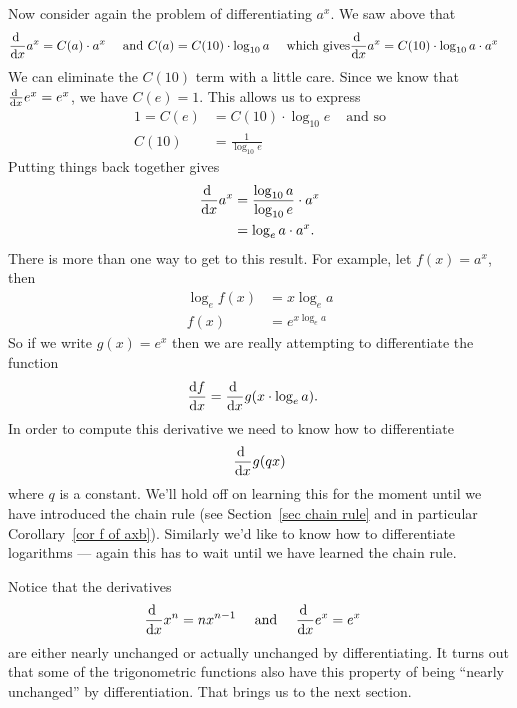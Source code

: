 Now consider again the problem of differentiating $a^x$. We saw above that
\begin{align*}
  \diff{}{x} a^x &= C(a) \cdot a^x & \text{ and }
  C(a) &= C(10) \cdot \log_{10} a & \text{ which gives}
  \diff{}{x} a^x &= C(10)\cdot \log_{10} a \cdot a^x
\end{align*}
We can eliminate the $C(10)$ term with a little care. Since we know that $\diff{}{x} e^x
= e^x$, we have $C(e)=1$. This allows us to express
\begin{align*}
  1 = C(e) &= C(10) \cdot \log_{10} e & \text{ and so} \\
  C(10) &= \frac{1}{\log_{10} e}
\end{align*}
Putting things back together gives
\begin{align*}
  \diff{}{x} a^x &= \frac{\log_{10} a}{\log_{10} e} \cdot a^x \\
  &= \log_e a \cdot a^x.
\end{align*}
There is more than one way to get to this result. For example, let $f(x) =
a^x$, then
\begin{align*}
  \log_e f(x) &= x \log_e a \\
  f(x) &= e^{ x \log_e a}
\end{align*}
So if we write $g(x) = e^x$ then we are really attempting to differentiate the
function
\begin{align*}
  \diff{f}{x} &= \diff{}{x} g(x \cdot \log_e a).
\end{align*}
In order to compute this derivative we need to know how to differentiate
\begin{align*}
  \diff{}{x} g( q x)
\end{align*}
where $q$ is a constant. We'll hold off on learning this for the moment until
we have introduced the chain rule (see Section~\ref{sec chain rule} and in
particular Corollary~\ref{cor f of axb}). Similarly we'd like to know how to
differentiate logarithms --- again this has to wait until we have learned the
chain rule.


Notice that the derivatives
\begin{align*}
  \diff{}{x} x^n &= n x^{n-1} & \text{ and }&&
  \diff{}{x} e^x &= e^x
\end{align*}
are either nearly unchanged or actually unchanged by differentiating. It turns
out that some of the trigonometric functions also have this property of being
``nearly unchanged'' by differentiation. That brings us to the next section.


